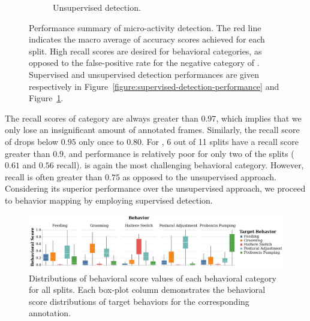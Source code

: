 \begin{figure}[htb!]
\begin{subfigure}[b]{0.495\linewidth}
		\caption{Unsupervised detection. \label{figure:unsupervised-detection-performance}}
	\end{subfigure}%
	\caption[Performance summary of micro-activity detection.]{Performance summary of micro-activity detection.
		The red line indicates the macro average of accuracy scores achieved for each split.
		High recall scores are desired for behavioral categories, as opposed to the false-positive rate for the negative category of \QuiescentOther.
		Supervised and unsupervised detection performances are given respectively in Figure~\ref{figure:supervised-detection-performance} and Figure~\ref{figure:unsupervised-detection-performance}. \label{figure:detection-performance}}
\end{figure}

The recall scores of \ProboscisPumping category are always greater than $0.97$, which implies that we only lose an insignificant amount of annotated frames.
Similarly, the recall score of \Feeding drops below $0.95$ only once to $0.80$.
For \ProboscisPumping, 6 out of 11 splits have a recall score greater than $0.9$, and performance is relatively poor for only two of the splits ($0.61$ and $0.56$ recall).
\CHaltereSwitch is again the most challenging behavioral category. However, recall is often greater than $0.75$ as opposed to the unsupervised approach.
Considering its superior performance over the unsupervised approach, we proceed to behavior mapping by employing supervised detection.

\begin{figure}[htb!]
	\centering
	\includegraphics[width=\linewidth]{figures/BehavioralScoresDistributions_perBehavior.pdf}
	\caption[Distributions of behavioral score values of each behavioral category for all splits together.]{Distributions of behavioral score values of each behavioral category for all splits.
		Each box-plot column demonstrates the behavioral score distributions of target behaviors for the corresponding annotation.\label{figure:behavioral-score-distributions}}
\end{figure}


